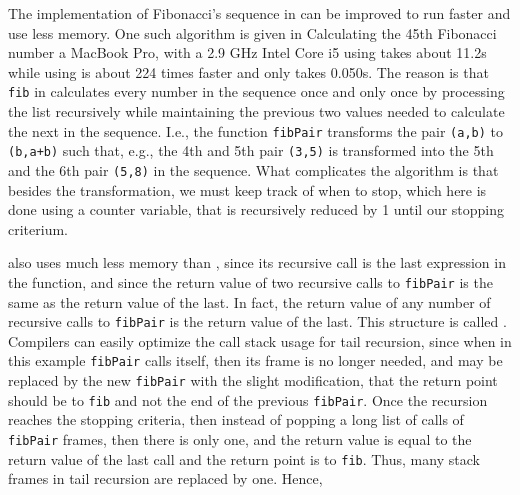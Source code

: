 \documentclass[springer.tex]{subfiles}
\begin{document}
The implementation of Fibonacci's sequence in  can be improved to run faster and use less memory. One such algorithm is given in 
%
%
Calculating the 45th Fibonacci number a MacBook Pro, with a 2.9 GHz Intel Core i5 using  takes about 11.2s while using  is about 224 times faster and only takes 0.050s. The reason is that \lstinline{fib} in  calculates every number in the sequence once and only once by processing the list recursively while maintaining the previous two values needed to calculate the next in the sequence. I.e., the function \lstinline{fibPair} transforms the pair \lstinline{(a,b)} to \lstinline{(b,a+b)} such that, e.g., the 4th and 5th pair \lstinline{(3,5)} is transformed into the 5th and the 6th pair \lstinline{(5,8)} in the sequence. What complicates the algorithm is that besides the transformation, we must keep track of when to stop, which here is done using a counter variable, that is recursively reduced by 1 until our stopping criterium.

 also uses much less memory than , since its recursive call is the last expression in the function, and since the return value of two recursive calls to \lstinline{fibPair} is the same as the return value of the last. In fact, the return value of any number of recursive calls to \lstinline{fibPair} is the return value of the last. This structure is called . Compilers can easily optimize the call stack usage for tail recursion, since when in this example \lstinline{fibPair} calls itself, then its frame is no longer needed, and may be replaced by the new \lstinline{fibPair} with the slight modification, that the return point should be to \lstinline{fib} and not the end of the previous \lstinline{fibPair}. Once the recursion reaches the stopping criteria, then instead of popping a long list of calls of \lstinline{fibPair} frames, then there is only one, and the return value is equal to the return value of the last call and the return point is to \lstinline{fib}. Thus, many stack frames in tail recursion are replaced by one. Hence, 
\end{document}
